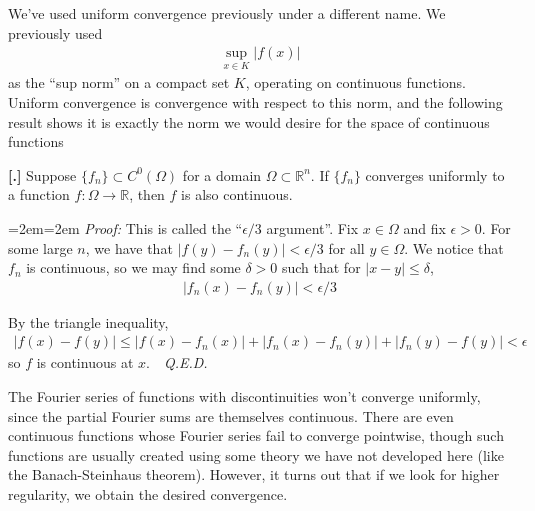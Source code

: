 \documentclass{article}
\newcommand{\R}{{\mathbb{R}}}
\newcounter{result}[section]
\newenvironment{res}[1][]{\refstepcounter{result}\par\medskip
	\noindent \textbf{[\thesection.\theresult] #1} \rmfamily}{\medskip}
\newenvironment{pf}{%
	\par%
	\medskip
	\leftskip=2em\rightskip=2em%
	\noindent\ignorespaces \textit{Proof:} \newline}{%
	\,\, \newline \textit{Q.E.D.}\par\medskip}
\begin{document}
	We've used uniform convergence previously under a different name. We previously used 
	\begin{align*}
		\sup_{x \in K} |f(x)|
	\end{align*}
	as the ``sup norm'' on a compact set $K$, operating on continuous functions. Uniform convergence is convergence with respect to this norm, and the following result shows it is exactly the norm we would desire for the space of continuous functions
	
	\begin{res}
		Suppose $\{f_{n}\} \subset C^{0}(\Omega)$ for a domain $\Omega \subset \R^{n}$. If $\{f_{n}\}$ converges uniformly to a function $f:\Omega \to \R$, then $f$ is also continuous.
	\end{res}
	\begin{pf}
		This is called the ``$\epsilon/3$ argument''. Fix $x \in \Omega$ and fix $\epsilon > 0$. For some large $n$, we have that $|f(y) - f_{n}(y)| < \epsilon/3$ for all $y \in \Omega$.  We notice that $f_{n}$ is continuous, so we may find some $\delta>0$ such that for $|x-y| \leq \delta$, 
		\begin{align*}
			|f_{n}(x) - f_{n}(y)| < \epsilon/3 
		\end{align*} 
		
		By the triangle inequality, 
		\begin{align*}
			|f(x) - f(y)| \leq |f(x) - f_{n}(x)| + |f_{n}(x) - f_{n}(y)| + |f_{n}(y) - f(y)| < \epsilon 
		\end{align*}
		so $f$ is continuous at $x$. 
	\end{pf}
	
	
	The Fourier series of functions with discontinuities won't converge uniformly, since the partial Fourier sums are themselves continuous. There are even continuous functions whose Fourier series fail to converge pointwise, though such functions are usually created using some theory we have not developed here (like the Banach-Steinhaus theorem). However, it turns out that if we look for higher regularity, we obtain the desired convergence. 
	
\end{document}
